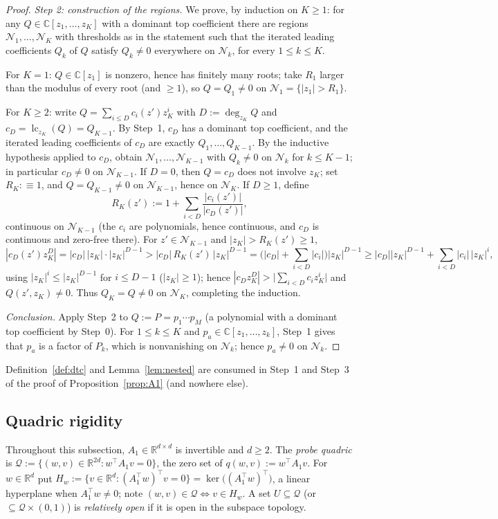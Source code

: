 \documentclass[11pt]{article}
\theoremstyle{definition}
\theoremstyle{remark}
\theoremstyle{plain}
\newcommand{\R}{\mathbb{R}}
\newcommand{\C}{\mathbb{C}}
\newcommand{\cQ}{\mathcal{Q}}
\newcommand{\cN}{\mathcal{N}}
\begin{document}
\begin{proof}
\emph{Step 2: construction of the regions.}  We prove, by induction on $K\ge1$: for any
$Q\in\C[z_1,\dots,z_K]$ with a dominant top coefficient there are regions
$\cN_1,\dots,\cN_K$ with thresholds as in the statement such that the iterated leading
coefficients $Q_k$ of $Q$ satisfy $Q_k\neq0$ everywhere on $\cN_k$, for every
$1\le k\le K$.

For $K=1$: $Q\in\C[z_1]$ is nonzero, hence has finitely many roots; take $R_1$ larger
than the modulus of every root (and $\ge1$), so $Q=Q_1\neq0$ on
$\cN_1=\{|z_1|>R_1\}$.

For $K\ge2$: write $Q=\sum_{i\le D}c_i(z')z_K^i$ with $D:=\deg_{z_K}Q$ and
$c_D=\operatorname{lc}_{z_K}(Q)=Q_{K-1}$.  By Step~1, $c_D$ has a dominant top
coefficient, and the iterated leading coefficients of $c_D$ are exactly
$Q_1,\dots,Q_{K-1}$.  By the inductive hypothesis applied to $c_D$, obtain
$\cN_1,\dots,\cN_{K-1}$ with $Q_k\neq0$ on $\cN_k$ for $k\le K-1$; in particular
$c_D\neq0$ on $\cN_{K-1}$.  If $D=0$, then $Q=c_D$ does not involve $z_K$; set
$R_K:\equiv1$, and $Q=Q_{K-1}\neq0$ on $\cN_{K-1}$, hence on $\cN_K$.  If $D\ge1$, define
\[
R_K(z'):=1+\sum_{i<D}\frac{|c_i(z')|}{|c_D(z')|},
\]
continuous on $\cN_{K-1}$ (the $c_i$ are polynomials, hence continuous, and $c_D$ is
continuous and zero-free there).  For $z'\in\cN_{K-1}$ and $|z_K|>R_K(z')\ge1$,
\[
|c_D(z')z_K^D|=|c_D|\,|z_K|\cdot|z_K|^{D-1}
>|c_D|\,R_K(z')\,|z_K|^{D-1}
=\Big(|c_D|+\sum_{i<D}|c_i|\Big)|z_K|^{D-1}
\ge|c_D||z_K|^{D-1}+\sum_{i<D}|c_i|\,|z_K|^{i},
\]
using $|z_K|^i\le|z_K|^{D-1}$ for $i\le D-1$ ($|z_K|\ge1$); hence
$|c_Dz_K^D|>\big|\sum_{i<D}c_iz_K^i\big|$ and $Q(z',z_K)\neq0$.  Thus $Q_K=Q\neq0$ on
$\cN_K$, completing the induction.

\emph{Conclusion.}  Apply Step~2 to $Q:=P=p_1\cdots p_M$ (a polynomial with a dominant
top coefficient by Step~0).  For $1\le k\le K$ and $p_a\in\C[z_1,\dots,z_k]$, Step~1
gives that $p_a$ is a factor of $P_k$, which is nonvanishing on $\cN_k$; hence
$p_a\neq0$ on $\cN_k$.
\end{proof}

Definition~\ref{def:dtc} and Lemma~\ref{lem:nested} are consumed in Step~1 and Step~3 of
the proof of Proposition~\ref{prop:A1} (and nowhere else).

\subsection{Quadric rigidity}

Throughout this subsection, $A_1\in\R^{d\times d}$ is invertible and $d\ge2$.  The
\emph{probe quadric} is $\cQ:=\{(w,v)\in\R^{2d}:w^\top A_1v=0\}$, the zero set of
$q(w,v):=w^\top A_1v$.  For $w\in\R^d$ put
$H_w:=\{v\in\R^d:(A_1^\top w)^\top v=0\}=\ker\big((A_1^\top w)^\top\big)$, a linear
hyperplane when $A_1^\top w\neq0$; note $(w,v)\in\cQ\iff v\in H_w$.  A set
$U\subseteq\cQ$ (or $\subseteq\cQ\times(0,1)$) is \emph{relatively open} if it is open in
the subspace topology.
\end{document}
